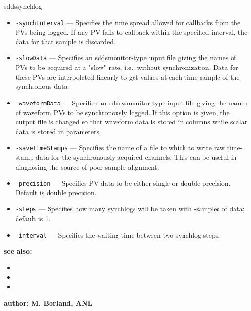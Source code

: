 \begin{sddsprog}{sddssynchlog}
\begin{itemize}
        \item {\tt -synchInterval} --- Specifies the time spread allowed for callbacks from the PVs being logged.
                If any PV fails to callback within the specified interval, the data for
                that sample is discarded.
        \item {\tt -slowData} --- Specifies an sddsmonitor-type input file giving the names of PVs to be
                acquired at a "slow" rate, i.e., without synchronization.  Data for these PVs
                are interpolated linearly to get values at each time sample of the synchronous
                data.
        \item {\tt -waveformData} --- Specifies an sddswmonitor-type input file giving the names of waveform PVs to
                be synchronously logged.  If this option is given, the output file is changed
                so that waveform data is stored in columns while scalar data is stored in
                parameters.
        \item {\tt -saveTimeStamps} --- Specifies the name of a file to which to write raw time-stamp data for the
                synchronously-acquired channels.  This can be useful in diagnosing the source
                of poor sample alignment.
        \item {\tt -precision} --- Specifies PV data to be either single or double precision.  Default is double precision.
        \item {\tt -steps} --- Specifies how many synchlogs will be taken with -samples of data; default is 1.
        \item {\tt -interval} --- Specifies the waiting time between two synchlog steps.
    \end{itemize}

\item {\bf see also:}
    \begin{itemize}
%
%
    \item {}
    \item {}
    \item {}
    \end{itemize}
%
%
\item {\bf author: M. Borland, ANL} 
\end{sddsprog}
